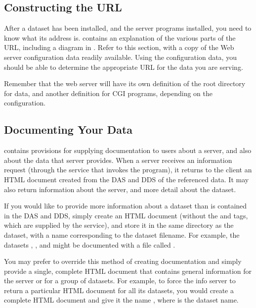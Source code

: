 \subsection{Constructing the URL}

After a dataset has been installed, and the server programs installed,
you need to know what its address is.  
contains an explanation of the various parts of the \opendap URL,
including a diagram in .  Refer
to this section, with a copy of the Web server configuration data
readily available.  Using the configuration data, you should be able
to determine the appropriate URL for the data you are serving.

Remember that the web server will have its own definition of the root
directory for data, and another definition for CGI programs, depending
on the configuration.  


\subsection{Documenting Your Data}
\label{sec,document-data}

\opendap contains provisions for supplying documentation to users about a
server, and also about the data that server provides.  When a server
receives an information request (through the  service that
invokes the  program), it
returns to the client an HTML document created from the DAS and DDS of
the referenced data.  It may also return information about the server,
and more detail about the dataset.

If you would like to provide more information about a dataset than is
contained in the DAS and DDS, simply create an HTML document (without
the  and  tags, which are supplied by the
 service), and store it in the same directory as the
dataset, with a name corresponding to the dataset filename.  For
example, the datasets , , and
 might be documented with a file called .

You may prefer to override this method of creating documentation and
simply provide a single, complete HTML document that contains general
information for the server or for a group of datasets.  For example,
to force the info server to return a particular HTML document for all
its datasets, you would create a complete HTML document and give it
the name , where  is the dataset
name.

